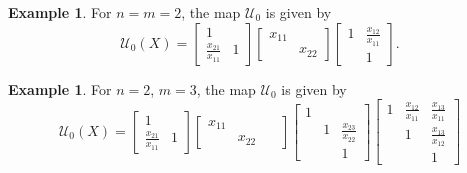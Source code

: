 \documentclass[11pt]{article}
\theoremstyle{definition}\newtheorem{definition}[theorem]{Definition}
\theoremstyle{definition}\newtheorem{remark}[theorem]{Remark}
\newtheorem{example}[theorem]{Example}
\theoremstyle{remark}
\numberwithin{equation}{section}
\begin{document}
\begin{example}
    For $n = m = 2$, the map $\mathcal{U}_0$ is given by
    \begin{equation*}
        \mathcal{U}_0(X) = \begin{bmatrix}
            1 & \\
            \frac{x_{21}}{x_{11}} & 1
        \end{bmatrix} \begin{bmatrix}
            x_{11} &\\
            & x_{22}
        \end{bmatrix} \begin{bmatrix}
            1 & \frac{x_{12}}{x_{11}}\\
            & 1
        \end{bmatrix}.
    \end{equation*}
\end{example}
\begin{example}\label{ex:U0_23}
    For $n=2$, $m = 3$, the map $\mathcal{U}_0$ is given by
    \begin{equation*}
        \mathcal{U}_0(X) = \begin{bmatrix}
            1 & \\
            \frac{x_{21}}{x_{11}} & 1
        \end{bmatrix} \begin{bmatrix}
            x_{11} & &\;\; \\
            & x_{22} &\;\;
        \end{bmatrix}
        \begin{bmatrix}
            1 & &\\
            & 1 & \frac{x_{23}}{x_{22}}\\
            & & 1
        \end{bmatrix}
        \begin{bmatrix}
            1 & \frac{x_{12}}{x_{11}} & \frac{x_{13}}{x_{11}}\\
            & 1 & \frac{x_{13}}{x_{12}}\\
            & & 1
        \end{bmatrix}
    \end{equation*}
\end{example}
\end{document}
